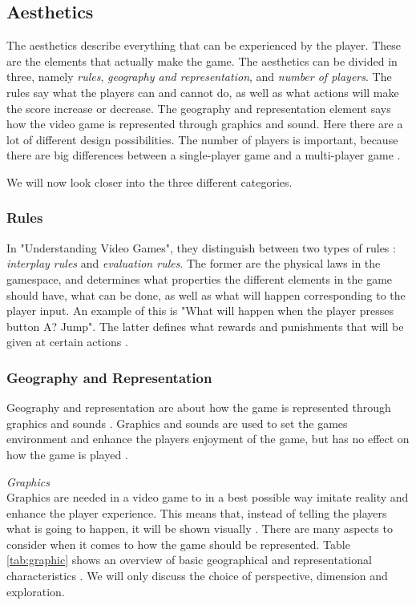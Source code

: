 \subsection{Aesthetics}
The aesthetics describe everything that can be experienced by the player. These are the elements that actually make the game. The aesthetics can be divided in three, namely \emph{rules}, \emph{geography and representation}, and \emph{number of players}. The rules say what the players can and cannot do, as well as what actions will make the score increase or decrease. The geography and representation element says how the video game is represented through graphics and sound. Here there are a lot of different design possibilities. The number of players is important, because there are big differences between a single-player game and a multi-player game \cite{understandingvg}.

We will now look closer into the three different categories.

\subsubsection{Rules}
In "Understanding Video Games", they distinguish between two types of rules  \cite{understandingvg}: \emph{interplay rules} and \emph{evaluation rules}. The former are the physical laws in the gamespace, and determines what properties the different elements in the game should have, what can be done, as well as what will happen corresponding to the player input. An example of this is "What will happen when the player presses button A? Jump". The latter defines what rewards and punishments that will be given at certain actions \cite{understandingvg}. 

\subsubsection{Geography and Representation}
\label{sec:georep}
Geography and representation are about how the game is represented through graphics and sounds \cite{understandingvg}. Graphics and sounds are used to set the games environment and enhance the players enjoyment of the game, but has no effect on how the game is played \cite{umlapproach}.  

\emph{Graphics}\\
Graphics are needed in a video game to in a best possible way imitate reality and enhance the player experience. This means that, instead of telling the players what is going to happen, it will be shown visually \cite{umlapproach}.
There are many aspects to consider when it comes to how the game should be represented. Table \ref{tab:graphic} shows an overview of basic geographical and representational characteristics \cite{understandingvg}. We will only discuss the choice of perspective, dimension and exploration. 

